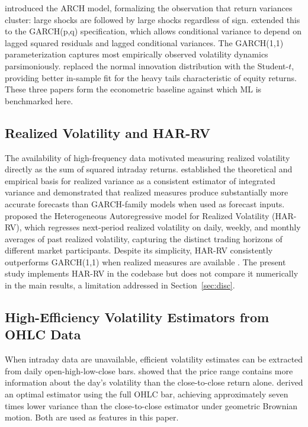 \documentclass[12pt]{article}
\begin{document}
\citet{Engle1982} introduced the ARCH model, formalizing the observation that
return variances cluster: large shocks are followed by large shocks regardless
of sign.  \citet{Bollerslev1986} extended this to the GARCH(p,q)
specification, which allows conditional variance to depend on lagged squared
residuals and lagged conditional variances.  The GARCH(1,1) parameterization
captures most empirically observed volatility dynamics parsimoniously.
\citet{Bollerslev1987} replaced the normal innovation distribution with the
Student-$t$, providing better in-sample fit for the heavy tails characteristic
of equity returns.  These three papers form the econometric baseline against
which ML is benchmarked here.

\subsection*{Realized Volatility and HAR-RV}

The availability of high-frequency data motivated measuring realized volatility
directly as the sum of squared intraday returns.  \citet{AndersenEtAl2003}
established the theoretical and empirical basis for realized variance as a
consistent estimator of integrated variance and demonstrated that realized
measures produce substantially more accurate forecasts than GARCH-family models
when used as forecast inputs.  \citet{Corsi2009} proposed the Heterogeneous
Autoregressive model for Realized Volatility (HAR-RV), which regresses
next-period realized volatility on daily, weekly, and monthly averages of past
realized volatility, capturing the distinct trading horizons of different market
participants.  Despite its simplicity, HAR-RV consistently outperforms
GARCH(1,1) when realized measures are available \citep{HansenLunde2005}.  The
present study implements HAR-RV in the codebase but does not compare it
numerically in the main results, a limitation addressed in
Section~\ref{sec:disc}.

\subsection*{High-Efficiency Volatility Estimators from OHLC Data}

When intraday data are unavailable, efficient volatility estimates can be
extracted from daily open-high-low-close bars.  \citet{Parkinson1980} showed
that the price range contains more information about the day's volatility than
the close-to-close return alone.  \citet{GarmanKlass1980} derived an optimal
estimator using the full OHLC bar, achieving approximately seven times lower
variance than the close-to-close estimator under geometric Brownian motion.
Both are used as features in this paper.
\end{document}
